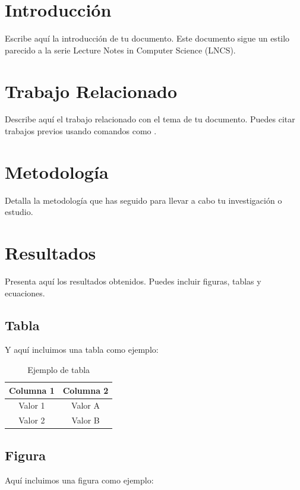 \section{Introducción}
Escribe aquí la introducción de tu documento. Este documento sigue un estilo parecido a la serie Lecture Notes in Computer Science (LNCS).

\section{Trabajo Relacionado}
Describe aquí el trabajo relacionado con el tema de tu documento. Puedes citar trabajos previos usando comandos como \cite{lamport1994latex}.

\section{Metodología}
Detalla la metodología que has seguido para llevar a cabo tu investigación o estudio.

\section{Resultados}
Presenta aquí los resultados obtenidos. Puedes incluir figuras, tablas y ecuaciones.

\subsection{Tabla}
Y aquí incluimos una tabla como ejemplo:

\begin{table}[htbp]
  \centering
  \caption{Ejemplo de tabla}
  \label{tab:ejemplo}
  \begin{tabular}{|c|c|}
    \hline
    \textbf{Columna 1} & \textbf{Columna 2} \\
    \hline
    Valor 1 & Valor A \\
    Valor 2 & Valor B \\
    \hline
  \end{tabular}
\end{table}

\subsection{Figura}
Aquí incluimos una figura como ejemplo:

